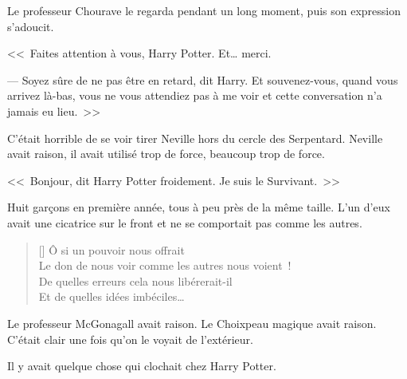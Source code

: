 Le professeur Chourave le regarda pendant un long moment, puis son expression s'adoucit.

<<~Faites attention à vous, Harry Potter. Et… merci.

--- Soyez sûre de ne pas être en retard, dit Harry. Et souvenez-vous, quand vous arrivez là-bas, vous ne vous attendiez pas à me voir et cette conversation n'a jamais eu lieu.~>>

\later

C'était horrible de se voir tirer Neville hors du cercle des Serpentard. Neville avait raison, il avait utilisé trop de force, beaucoup trop de force.

<<~Bonjour, dit Harry Potter froidement. Je suis le Survivant.~>>

Huit garçons en première année, tous à peu près de la même taille. L'un d'eux avait une cicatrice sur le front et ne se comportait pas comme les autres.

\baselineskip\settowidth{\versewidth}{Le don de nous voir comme les autres nous voient~!} \begin{verse}[\versewidth] Ô si un pouvoir nous offrait\\ Le don de nous voir comme les autres nous voient~!\\ De quelles erreurs cela nous libérerait-il\\ Et de quelles idées imbéciles… \end{verse}

Le professeur McGonagall avait raison. Le Choixpeau magique avait raison. C'était clair une fois qu'on le voyait de l'extérieur.

Il y avait quelque chose qui clochait chez Harry Potter.~ 


